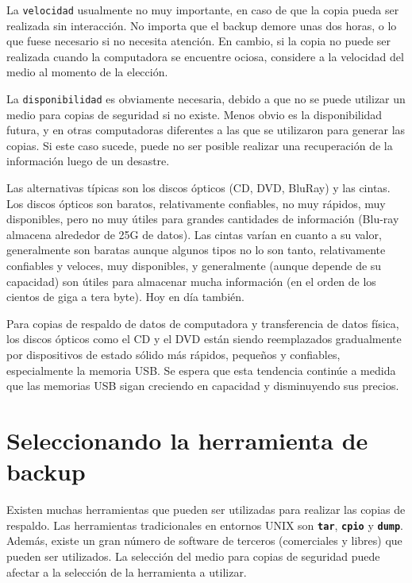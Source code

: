 ﻿\documentclass[12pt]{article}
\begin{document}
La \texttt{velocidad} usualmente no muy importante, en caso de que la 
copia pueda ser
realizada sin interacción. No importa que el backup demore unas 
dos horas, o lo que fuese necesario si no necesita atención. En cambio, si 
la copia no puede ser realizada cuando la computadora se encuentre ociosa, 
considere a la velocidad del medio al momento de la elección.

La \texttt{disponibilidad} es obviamente necesaria, debido a que no se 
puede utilizar
un medio para copias de seguridad si no existe. Menos obvio es la 
disponibilidad futura, y en otras computadoras diferentes a las que se 
utilizaron para generar las copias.
Si este caso sucede, puede no ser posible realizar una recuperación de la 
información luego de un desastre.

Las alternativas típicas son los discos ópticos (CD, DVD, BluRay) y las
cintas. Los discos ópticos son baratos, relativamente confiables, no muy 
rápidos, muy disponibles, pero no muy útiles para grandes cantidades de 
información (Blu-ray almacena alrededor de 25G de datos). Las 
cintas varían en cuanto a su valor, generalmente son baratas aunque algunos
tipos no lo son tanto, relativamente confiables y veloces, muy disponibles, 
y generalmente (aunque depende de su capacidad) son útiles para almacenar 
mucha información (en el orden de los cientos de giga a tera byte). Hoy 
en día también. 

Para copias de respaldo de datos de computadora y transferencia de datos 
física, los discos ópticos como el CD y el DVD están siendo reemplazados 
gradualmente por dispositivos de estado sólido más rápidos, pequeños y 
confiables, especialmente la memoria USB. Se espera que esta tendencia 
continúe a medida que las memorias USB sigan creciendo en capacidad y 
disminuyendo sus precios. 
	
\section{Seleccionando la herramienta de backup}

Existen muchas herramientas que pueden ser utilizadas para realizar las 
copias de respaldo.  Las herramientas tradicionales en entornos UNIX 
son \texttt{\textbf{tar}}, \texttt{\textbf{cpio}} y \texttt{\textbf{dump}}.
 Además, existe un gran 
número de software de terceros (comerciales y libres) que pueden ser 
utilizados. La selección del medio para copias de seguridad puede afectar 
a la selección de la herramienta a utilizar.
\end{document}
